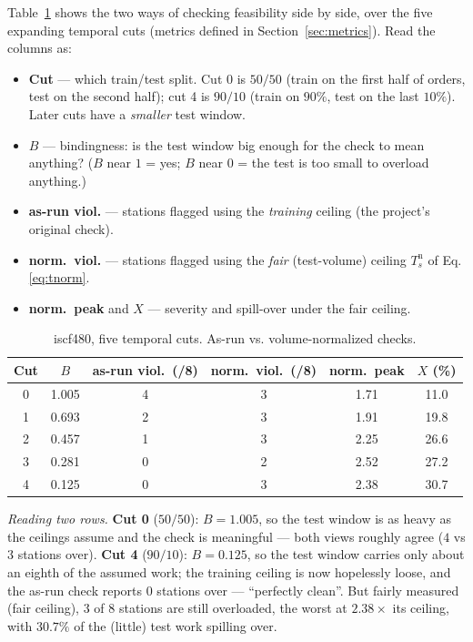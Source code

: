 \documentclass[11pt]{article}
\theoremstyle{definition}
\theoremstyle{plain}
\theoremstyle{remark}
\begin{document}
Table~\ref{tab:audit} shows the two ways of checking feasibility side by side,
over the five expanding temporal cuts (metrics defined in
Section~\ref{sec:metrics}). Read the columns as:
\begin{itemize}[nosep]
  \item \textbf{Cut} --- which train/test split. Cut 0 is $50/50$ (train on the
  first half of orders, test on the second half); cut 4 is $90/10$ (train on
  $90\%$, test on the last $10\%$). Later cuts have a \emph{smaller} test window.
  \item \textbf{$B$} --- bindingness: is the test window big enough for the check
  to mean anything? ($B$ near $1$ = yes; $B$ near $0$ = the test is too small to
  overload anything.)
  \item \textbf{as-run viol.} --- stations flagged using the \emph{training}
  ceiling (the project's original check).
  \item \textbf{norm.\ viol.} --- stations flagged using the \emph{fair}
  (test-volume) ceiling $T^{\mathrm n}_s$ of Eq.\,\eqref{eq:tnorm}.
  \item \textbf{norm.\ peak} and \textbf{$X$} --- severity and spill-over under
  the fair ceiling.
\end{itemize}

\begin{table}[h]\centering
\caption{iscf480, five temporal cuts. As-run vs. volume-normalized checks.}
\label{tab:audit}
\begin{tabular}{cccccc}
\toprule
Cut & $B$ & as-run viol.\ (/8) & norm.\ viol.\ (/8) & norm.\ peak & $X$ (\%) \\
\midrule
0 & 1.005 & 4 & 3 & 1.71 & 11.0 \\
1 & 0.693 & 2 & 3 & 1.91 & 19.8 \\
2 & 0.457 & 1 & 3 & 2.25 & 26.6 \\
3 & 0.281 & 0 & 2 & 2.52 & 27.2 \\
4 & 0.125 & 0 & 3 & 2.38 & 30.7 \\
\bottomrule
\end{tabular}
\end{table}

\emph{Reading two rows.} \textbf{Cut 0} ($50/50$): $B=1.005$, so the test window
is as heavy as the ceilings assume and the check is meaningful --- both views
roughly agree ($4$ vs $3$ stations over). \textbf{Cut 4} ($90/10$): $B=0.125$, so
the test window carries only about an eighth of the assumed work; the training
ceiling is now hopelessly loose, and the as-run check reports $0$ stations over
--- ``perfectly clean''. But fairly measured (fair ceiling), $3$ of $8$ stations
are still overloaded, the worst at $2.38\times$ its ceiling, with $30.7\%$ of the
(little) test work spilling over.
\end{document}
